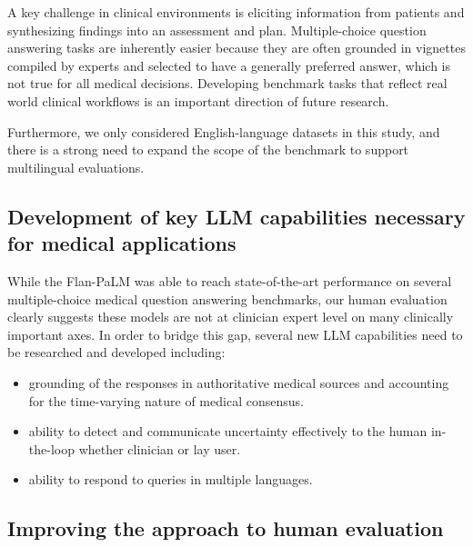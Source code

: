 \documentclass[10pt, letter, onecolumn]{arxiv}
\begin{document}
\begin{refsection}
A key challenge in clinical environments is eliciting information from patients and synthesizing findings into an assessment and plan. Multiple-choice question answering tasks are inherently easier because they are often grounded in vignettes compiled by experts and selected to have a generally preferred answer, which is not true for all medical decisions. Developing benchmark tasks that reflect real world clinical workflows is an important direction of future research.

Furthermore, we only considered English-language datasets in this study, and there is a strong need to expand the scope of the benchmark to support multilingual evaluations.

\subsection{Development of key LLM capabilities necessary for medical applications}

While the Flan-PaLM was able to reach state-of-the-art performance on several multiple-choice medical question answering benchmarks, our human evaluation clearly suggests these models are not at clinician expert level on many clinically important axes. In order to bridge this gap, several new LLM capabilities need to be researched and developed including:
\begin{itemize}
    \item grounding of the responses in authoritative medical sources and accounting for the time-varying nature of medical consensus.
    \item ability to detect and communicate uncertainty effectively to the human in-the-loop whether clinician or lay user. 
    \item ability to respond to queries in multiple languages.
\end{itemize}


\subsection{Improving the approach to human evaluation}


\end{refsection}
\end{document}
